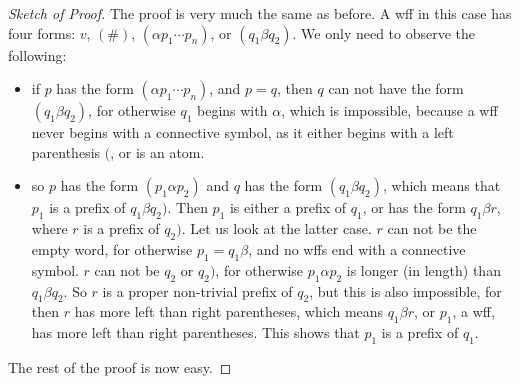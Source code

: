 \documentclass[12pt]{article}
\begin{document}
\begin{proof}[Sketch of Proof]  The proof is very much the same as before.  A wff in this case has four forms: $v$, $(\#)$, $(\alpha p_1 \cdots p_n)$, or $(q_1 \beta q_2)$.  We only need to observe the following:
\begin{itemize}
\item if $p$ has the form $(\alpha p_1 \cdots p_n)$, and $p=q$, then $q$ can not have the form $(q_1 \beta q_2)$, for otherwise $q_1$ begins with $\alpha$, which is impossible, because a wff never begins with a connective symbol, as it either begins with a left parenthesis $($, or is an atom.
\item so $p$ has the form $(p_1 \alpha p_2)$ and $q$ has the form $(q_1 \beta q_2)$, which means that $p_1$ is a prefix of $q_1 \beta q_2)$.  Then $p_1$ is either a prefix of $q_1$, or has the form $q_1 \beta r$, where $r$ is a prefix of $q_2)$.  Let us look at the latter case.  $r$ can not be the empty word, for otherwise $p_1 = q_1 \beta$, and no wffs end with a connective symbol.  $r$ can not be $q_2$ or $q_2)$, for otherwise $p_1 \alpha p_2$ is longer (in length) than $q_1 \beta q_2$.  So $r$ is a proper non-trivial prefix of $q_2$, but this is also impossible, for then $r$ has more left than right parentheses, which means $q_1\beta r$, or $p_1$, a wff, has more left than right parentheses.  This shows that $p_1$ is a prefix of $q_1$.
\end{itemize}
The rest of the proof is now easy.
\end{proof}
\end{document}
